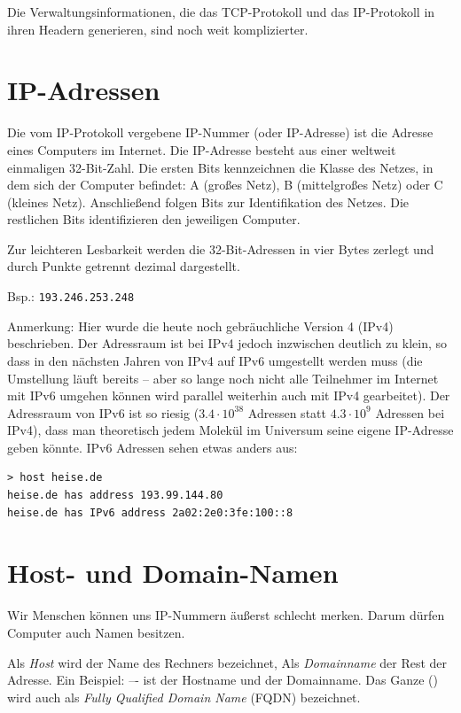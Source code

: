 Die Verwaltungsinformationen, die das TCP-Protokoll und das IP-Protokoll in
ihren Headern generieren, sind noch weit komplizierter.


\section{IP-Adressen}

Die vom IP-Protokoll vergebene IP-Nummer (oder IP-Adresse) ist die Adresse eines
Computers im Internet. Die IP-Adresse besteht aus einer weltweit einmaligen
32-Bit-Zahl. Die ersten Bits kennzeichnen die Klasse des Netzes, in dem sich
der Computer befindet: A (großes Netz), B (mittelgroßes Netz) oder C (kleines
Netz). Anschließend folgen Bits zur Identifikation des Netzes. Die restlichen
Bits identifizieren den jeweiligen Computer.

Zur leichteren Lesbarkeit werden die 32-Bit-Adressen in vier Bytes zerlegt und
durch Punkte getrennt dezimal dargestellt.

Bsp.: \lstinline|193.246.253.248|

Anmerkung: Hier wurde die heute noch gebräuchliche Version 4 (IPv4)
beschrieben. Der Adressraum ist bei IPv4 jedoch inzwischen deutlich zu klein,
so dass in den nächsten Jahren von IPv4 auf IPv6 umgestellt werden muss (die
Umstellung läuft bereits -- aber so lange noch nicht alle Teilnehmer im Internet
mit IPv6 umgehen können wird parallel weiterhin auch mit IPv4 gearbeitet). Der
Adressraum von IPv6 ist so riesig ($3.4 \cdot 10^{38}$ Adressen statt $4.3 \cdot
10^9$ Adressen bei IPv4), dass man theoretisch jedem Molekül im Universum seine
eigene IP-Adresse geben könnte. IPv6 Adressen sehen etwas anders aus:

\begin{lstlisting}
> host heise.de
heise.de has address 193.99.144.80
heise.de has IPv6 address 2a02:2e0:3fe:100::8
\end{lstlisting}
 
\section{Host- und Domain-Namen}

Wir Menschen können uns IP-Nummern äußerst schlecht merken. Darum dürfen
Computer auch Namen besitzen. 

Als \emph{Host} wird der Name des Rechners bezeichnet, Als \emph{Domainname} der
Rest der Adresse. Ein Beispiel:  –- 
ist der Hostname und  der Domainname.
Das Ganze () wird auch als \emph{Fully Qualified Domain
Name} (FQDN) bezeichnet.

